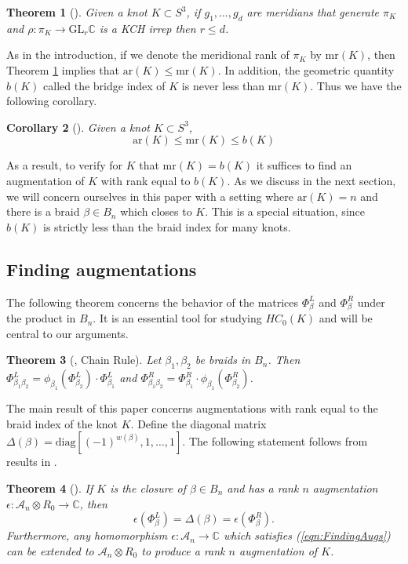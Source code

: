 \documentclass[11pt]{amsart}
\def\C{{\mathbb C}}
\def\A{{\mathcal A}}
\newtheorem{thm}{Theorem}[section]
\newtheorem{cor}[thm]{Corollary}
\theoremstyle{definition}
\begin{document}
  \begin{thm}[\cite{Cor13b}] Given a knot $K\subset S^3$, if $g_1,\ldots,g_d$ are meridians that generate $\pi_K$ and $\rho:\pi_K\to\text{GL}_r\C$ is a KCH irrep then $r\le d$.
  \label{thm:DimBound}
  \end{thm}

  As in the introduction, if we denote the meridional rank of $\pi_K$ by $\text{mr}(K)$, then Theorem \ref{thm:DimBound} implies that $\text{ar}(K)\le\text{mr}(K)$. In addition, the geometric quantity $b(K)$ called the bridge index of $K$ is never less than $\text{mr}(K)$. Thus we have the following corollary.
    
\begin{cor}[\cite{Cor13b}] Given a knot $K\subset S^3$,
$$\text{ar}(K)\le\text{mr}(K)\le b(K)$$
\label{cor:DimBound}
\end{cor}

  As a result, to verify for $K$ that $\text{mr}(K)=b(K)$ it suffices to find an augmentation of $K$ with rank equal to $b(K)$. As we discuss in the next section, we will concern ourselves in this paper with a setting where $\text{ar}(K)=n$ and there is a braid $\beta\in B_n$ which closes to $K$. This is a special situation, since $b(K)$ is strictly less than the braid index for many knots.

\subsection{Finding augmentations}
\label{SecBG_AugExist}
  The following theorem concerns the behavior of the matrices $\Phi_\beta^L$ and $\Phi_\beta^R$ under the product in $B_n$. It is an essential tool for studying $HC_0(K)$ and will be central to our arguments.

  \begin{thm}[\cite{Ng05}, Chain Rule] Let $\beta_1,\beta_2$ be braids in $B_n$. Then $\Phi_{\beta_1\beta_2}^L = \phi_{\beta_1}(\Phi_{\beta_2}^L)\cdot\Phi_{\beta_1}^L$ and $\Phi_{\beta_1\beta_2}^R = \Phi_{\beta_1}^R\cdot\phi_{\beta_1}(\Phi_{\beta_2}^R)$.
  \label{thm:ChainRule}
  \end{thm}

  The main result of this paper concerns augmentations with rank equal to the braid index of the knot $K$. Define the diagonal matrix $\Delta(\beta)=\text{diag}[(-1)^{w(\beta)},1,\ldots,1]$. The following statement follows from results in \cite[Section 5]{Cor13a}.

  \begin{thm}[\cite{Cor13a}] If $K$ is the closure of $\beta\in B_n$ and has a rank $n$ augmentation $\epsilon:\A_n\otimes R_0\to\C$, then 
    \begin{equation}
    \epsilon(\Phi_\beta^L)=\Delta(\beta)=\epsilon(\Phi_\beta^R).
    \label{eqn:FindingAugs}
    \end{equation}
    Furthermore, any homomorphism $\epsilon:\A_n\to\C$ which satisfies (\ref{eqn:FindingAugs}) can be extended to $\A_n\otimes R_0$ to produce a rank $n$ augmentation of $K$. 
  \label{thm:RanknAugs}
  \end{thm}
\end{document}
